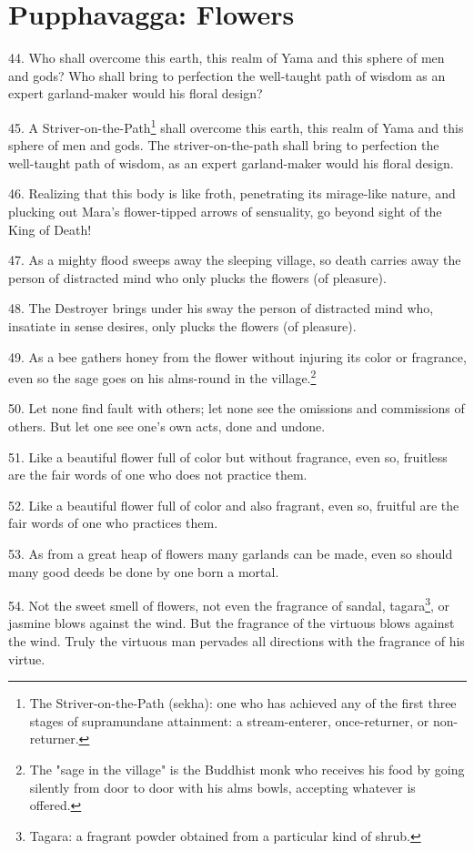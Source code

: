 \newpage
\chapter{Pupphavagga: Flowers}

44. Who shall overcome this earth, this realm of Yama and this sphere of men and gods? Who shall bring to perfection the well-taught path of wisdom as an expert garland-maker would his floral design?

45. A Striver-on-the-Path\footnote{The Striver-on-the-Path (sekha): one who has achieved any of the first three stages of supramundane attainment: a stream-enterer, once-returner, or non-returner.} shall overcome this earth, this realm of Yama and this sphere of men and gods. The striver-on-the-path shall bring to perfection the well-taught path of wisdom, as an expert garland-maker would his floral design.

46. Realizing that this body is like froth, penetrating its mirage-like nature, and plucking out Mara's flower-tipped arrows of sensuality, go beyond sight of the King of Death!

47. As a mighty flood sweeps away the sleeping village, so death carries away the person of distracted mind who only plucks the flowers (of pleasure).

48. The Destroyer brings under his sway the person of distracted mind who, insatiate in sense desires, only plucks the flowers (of pleasure).

49. As a bee gathers honey from the flower without injuring its color or fragrance, even so the sage goes on his alms-round in the village.\footnote{The "sage in the village" is the Buddhist monk who receives his food by going silently from door to door with his alms bowls, accepting whatever is offered.}

50. Let none find fault with others; let none see the omissions and commissions of others. But let one see one's own acts, done and undone.

51. Like a beautiful flower full of color but without fragrance, even so, fruitless are the fair words of one who does not practice them.

52. Like a beautiful flower full of color and also fragrant, even so, fruitful are the fair words of one who practices them.

53. As from a great heap of flowers many garlands can be made, even so should many good deeds be done by one born a mortal.

54. Not the sweet smell of flowers, not even the fragrance of sandal, tagara\footnote{Tagara: a fragrant powder obtained from a particular kind of shrub.}, or jasmine blows against the wind. But the fragrance of the virtuous blows against the wind. Truly the virtuous man pervades all directions with the fragrance of his virtue.

